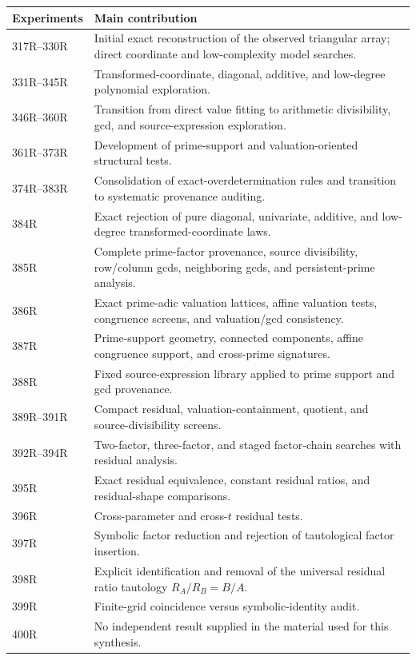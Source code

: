 \documentclass[11pt,a4paper]{article}
\begin{document}
\begin{longtable}{p{}p{}}
\toprule
\textbf{Experiments} & \textbf{Main contribution}\\
\midrule
317R--330R & Initial exact reconstruction of the observed triangular array; direct coordinate and low-complexity model searches.\\
331R--345R & Transformed-coordinate, diagonal, additive, and low-degree polynomial exploration.\\
346R--360R & Transition from direct value fitting to arithmetic divisibility, gcd, and source-expression exploration.\\
361R--373R & Development of prime-support and valuation-oriented structural tests.\\
374R--383R & Consolidation of exact-overdetermination rules and transition to systematic provenance auditing.\\
384R & Exact rejection of pure diagonal, univariate, additive, and low-degree transformed-coordinate laws.\\
385R & Complete prime-factor provenance, source divisibility, row/column gcds, neighboring gcds, and persistent-prime analysis.\\
386R & Exact prime-adic valuation lattices, affine valuation tests, congruence screens, and valuation/gcd consistency.\\
387R & Prime-support geometry, connected components, affine congruence support, and cross-prime signatures.\\
388R & Fixed source-expression library applied to prime support and gcd provenance.\\
389R--391R & Compact residual, valuation-containment, quotient, and source-divisibility screens.\\
392R--394R & Two-factor, three-factor, and staged factor-chain searches with residual analysis.\\
395R & Exact residual equivalence, constant residual ratios, and residual-shape comparisons.\\
396R & Cross-parameter and cross-$t$ residual tests.\\
397R & Symbolic factor reduction and rejection of tautological factor insertion.\\
398R & Explicit identification and removal of the universal residual ratio tautology $R_A/R_B=B/A$.\\
399R & Finite-grid coincidence versus symbolic-identity audit.\\
400R & No independent result supplied in the material used for this synthesis.\\

\end{longtable}
\end{document}
